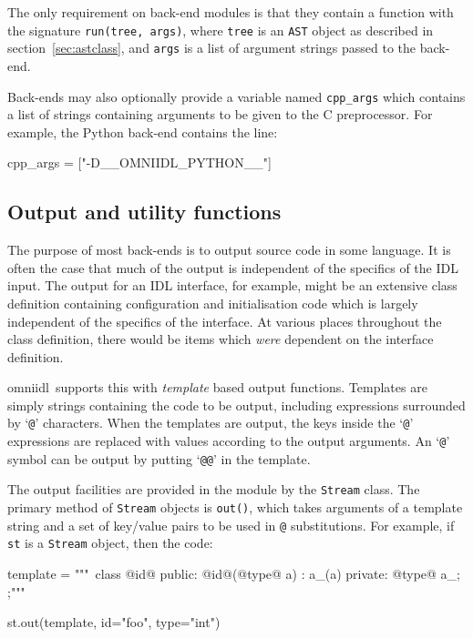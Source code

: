 \documentclass[11pt,twoside,a4paper]{article}
\newcommand{\omniidl}{\textsf{omniidl}}
\newcommand{\func}[1]{\texttt{#1}}
\newcommand{\var}[1]{\texttt{#1}}
\newcommand{\class}[1]{\texttt{#1}}
\newcommand{\file}{\begingroup \urlstyle{tt}\Url}
\begin{document}
The only requirement on back-end modules is that they contain a
function with the signature \func{run(tree, args)}, where \var{tree}
is an \class{AST} object as described in section~\ref{sec:astclass},
and \var{args} is a list of argument strings passed to the back-end.

Back-ends may also optionally provide a variable named \var{cpp\_args}
which contains a list of strings containing arguments to be given to
the C preprocessor. For example, the Python back-end contains the
line:

\begin{pylisting}
cpp_args = ["-D__OMNIIDL_PYTHON__"]
\end{pylisting}



\subsection{Output and utility functions}

The purpose of most back-ends is to output source code in some
language. It is often the case that much of the output is independent
of the specifics of the IDL input. The output for an IDL interface,
for example, might be an extensive class definition containing
configuration and initialisation code which is largely independent of
the specifics of the interface. At various places throughout the class
definition, there would be items which \emph{were} dependent on the
interface definition.

\omniidl\ supports this with \emph{template} based output functions.
Templates are simply strings containing the code to be output,
including expressions surrounded by `\texttt{@}' characters. When the
templates are output, the keys inside the `\texttt{@}' expressions are
replaced with values according to the output arguments. An
`\texttt{@}' symbol can be output by putting `\texttt{@@}' in the
template.

The output facilities are provided in the \file{omniidl.output} module
by the \class{Stream} class. The primary method of \class{Stream}
objects is \func{out()}, which takes arguments of a template string
and a set of key/value pairs to be used in \texttt{@} substitutions.
For example, if \var{st} is a \class{Stream} object, then the code:

\begin{pylisting}
    template = """\
  class @id@ {
  public:
    @id@(@type@ a) : a_(a) {}
  private:
    @type@ a_;
  };"""

    st.out(template, id="foo", type="int")
\end{pylisting}
\end{document}
